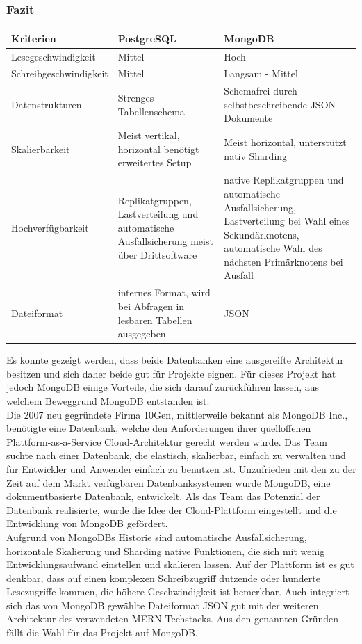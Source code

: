 \subsubsection{Fazit}
\begin{center} %
    \begin{tabularx}{\linewidth}{ |X|X|X| } 
        \hline
        Kriterien & PostgreSQL & MongoDB  \\ 
        \hline
        Lesegeschwindigkeit & Mittel & Hoch \\
        Schreibgeschwindigkeit & Mittel & Langsam - Mittel \\
        Datenstrukturen & Strenges Tabellenschema & Schemafrei durch selbstbeschreibende JSON-Dokumente \\
        Skalierbarkeit & Meist vertikal, horizontal benötigt erweitertes Setup & Meist horizontal, unterstützt nativ Sharding \\
        Hochverfügbarkeit & Replikatgruppen, Lastverteilung und automatische Ausfallsicherung meist über Drittsoftware & native Replikatgruppen und automatische Ausfallsicherung, Lastverteilung bei Wahl eines Sekundärknotens, automatische Wahl des nächsten Primärknotens bei Ausfall \\
        Dateiformat & internes Format, wird bei Abfragen in lesbaren Tabellen ausgegeben & JSON \\
        \hline
    \end{tabularx}
\end{center}

Es konnte gezeigt werden, dass beide Datenbanken eine ausgereifte Architektur besitzen und sich daher beide gut für Projekte eignen.
Für dieses Projekt hat jedoch MongoDB einige Vorteile, die sich darauf zurückführen lassen, aus welchem Beweggrund MongoDB entstanden ist.\\ %
Die 2007 neu gegründete Firma 10Gen, mittlerweile bekannt als MongoDB Inc., benötigte eine Datenbank, welche den Anforderungen ihrer quelloffenen Plattform-as-a-Service Cloud-Architektur gerecht werden würde.
Das Team suchte nach einer Datenbank, die elastisch, skalierbar, einfach zu verwalten und für Entwickler und Anwender einfach zu benutzen ist.
Unzufrieden mit den zu der Zeit auf dem Markt verfügbaren Datenbanksystemen wurde MongoDB, eine dokumentbasierte Datenbank, entwickelt.
Als das Team das Potenzial der Datenbank realisierte, wurde die Idee der Cloud-Plattform eingestellt und die Entwicklung von MongoDB gefördert.\cite{MG9}\\
Aufgrund von MongoDBs Historie sind automatische Ausfallsicherung, horizontale Skalierung und Sharding native Funktionen, die sich mit wenig Entwicklungsaufwand einstellen und skalieren lassen.
Auf der Plattform ist es gut denkbar, dass auf einen komplexen Schreibzugriff dutzende oder hunderte Lesezugriffe kommen, die höhere Geschwindigkeit ist bemerkbar. Auch integriert sich das von MongoDB gewählte Dateiformat JSON gut mit der weiteren Architektur des verwendeten MERN-Techstacks.
Aus den genannten Gründen fällt die Wahl für das Projekt auf MongoDB.



